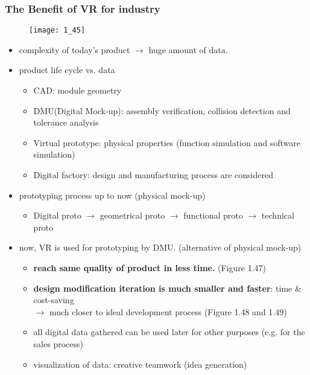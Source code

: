 \documentclass{standalone}
\begin{document}
\pagebreak

\subsubsection{The Benefit of VR for industry}

\begin{figure}[H]
	\texttt{[image: 1\_45]}
\end{figure}

\begin{itemize}
	\item complexity of today's product $\rightarrow$ huge amount of data.
	\item product life cycle vs. data
		\begin{itemize}
			\item CAD: module geometry
			\item DMU(Digital Mock-up): assembly verification, collision detection and tolerance analysis
			\item Virtual prototype: physical properties (function simulation and software simulation)
			\item Digital factory: design and manufacturing process are considered
		\end{itemize}
	\item prototyping process up to now (physical mock-up)
		\begin{itemize}
			\item Digital proto $\rightarrow$ geometrical proto $\rightarrow$ functional proto $\rightarrow$ technical proto
		\end{itemize}
	\item now, VR is used for prototyping by DMU. (alternative of physical mock-up)
		\begin{itemize}
			\item \textbf{reach same quality of product in less time.} (Figure 1.47)
			\item \textbf{design modification iteration is much smaller and faster}: time \& cost-saving \\
				$\rightarrow$ much closer to ideal development process (Figure 1.48 and 1.49)
			\item all digital data gathered can be used later for other purposes (e.g. for the sales process)
			\item visualization of data: creative teamwork (idea generation)
		\end{itemize}
\end{itemize}
\end{document}
